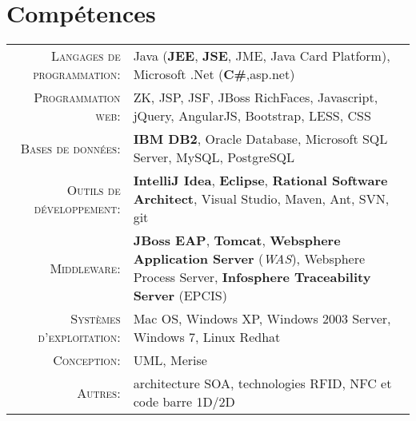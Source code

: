 \section{\texorpdfstring{\color{Blue}Compétences}{Compétences}}
\renewcommand{\arraystretch}{1.1}


	\begin{tabular}{>{\small}r>{\small}p{13cm}} 
		\textsc{Langages de programmation:}  &   Java (\textbf{JEE}, \textbf{JSE}, JME, Java Card Platform), Microsoft .Net (\textbf{C\#},asp.net)\\ 
		\textsc{Programmation web:}               &   ZK, JSP, JSF, JBoss RichFaces, Javascript, jQuery, AngularJS, Bootstrap, LESS, CSS\\ 
		\textsc{Bases de données:}                  &   \textbf{IBM DB2}, Oracle Database, Microsoft SQL Server, MySQL, PostgreSQL \\ 
		\textsc{Outils de développement:}	  &   \textbf {IntelliJ Idea}, \textbf {Eclipse}, \textbf{Rational Software Architect}, Visual Studio, Maven, Ant, SVN, git\\
		\textsc{Middleware:}				        &   \textbf{JBoss EAP}, \textbf{Tomcat}, \textbf{Websphere Application Server} (\emph{WAS}), 	Websphere Process Server, \textbf{Infosphere Traceability Server} (EPCIS) \\ 
		\textsc{Systèmes d'exploitation:}	        &   Mac OS, Windows XP, Windows 2003 Server, Windows 7, Linux Redhat\\ 
		\textsc{Conception:}				        &   UML, Merise\\
		\textsc{Autres:}					        &   architecture SOA, technologies RFID, NFC et code barre 1D/2D
	\end{tabular}